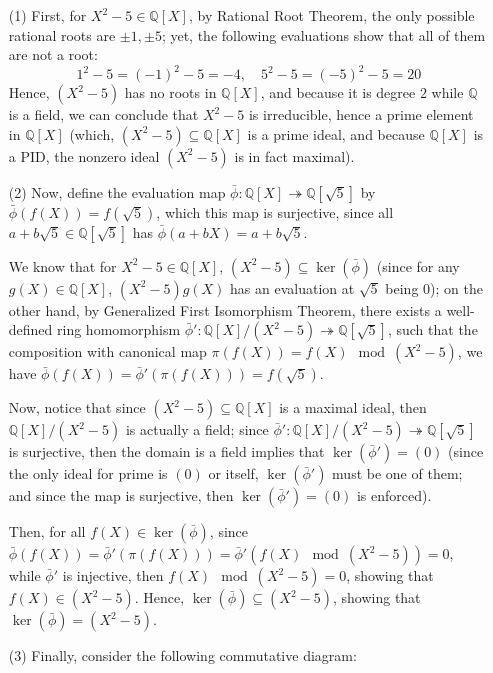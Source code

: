 \documentclass{article}
\begin{document}
\begin{itemize}
    \item[(1)] First, for $X^2-5\in \mathbb{Q}[X]$, by Rational Root Theorem, the only possible rational roots are $\pm 1,\pm 5$; yet, the following evaluations show that all of them are not a root:
    $$1^2-5 = (-1)^2-5 = -4,\quad 5^2-5 = (-5)^2-5 = 20$$
    Hence, $(X^2-5)$ has no roots in $\mathbb{Q}[X]$, and because it is degree $2$ while $\mathbb{Q}$ is a field, we can conclude that $X^2-5$ is irreducible, hence a prime element in $\mathbb{Q}[X]$ (which, $(X^2-5)\subseteq \mathbb{Q}[X]$ is a prime ideal, 
    and because $\mathbb{Q}[X]$ is a PID, the nonzero ideal $(X^2-5)$ is in fact maximal).

    \hfil

    \item[(2)] Now, define the evaluation map $\bar{\phi}:\mathbb{Q}[X]\twoheadrightarrow \mathbb{Q}[\sqrt{5}]$ by 
    $\bar{\phi}(f(X))=f(\sqrt{5})$, which this map is surjective, since all $a+b\sqrt{5}\in\mathbb{Q}[\sqrt{5}]$ has $\bar{\phi}(a+bX)=a+b\sqrt{5}$.
    
    We know that for $X^2-5\in \mathbb{Q}[X]$, $(X^2-5)\subseteq \ker(\bar{\phi})$ (since for any $g(X)\in\mathbb{Q}[X]$, $(X^2-5)g(X)$ has an evaluation at $\sqrt{5}$ being $0$); on the other hand, by Generalized First Isomorphism Theorem, 
    there exists a well-defined ring homomorphism $\bar{\phi}':\mathbb{Q}[X]/(X^2-5)\twoheadrightarrow \mathbb{Q}[\sqrt{5}]$, such that the composition with canonical map $\pi(f(X))=f(X)\mod (X^2-5)$, we have $\bar{\phi}(f(X))=\bar{\phi}'(\pi(f(X)))=f(\sqrt{5})$.

    Now, notice that since $(X^2-5)\subseteq \mathbb{Q}[X]$ is a maximal ideal, then $\mathbb{Q}[X]/(X^2-5)$ is actually a field;
    since $\bar{\phi}':\mathbb{Q}[X]/(X^2-5)\twoheadrightarrow \mathbb{Q}[\sqrt{5}]$ is surjective, then the domain is a field implies that $\ker(\bar{\phi}') = (0)$ (since the only ideal for prime is $(0)$ or itself, $\ker(\bar{\phi}')$ must be one of them; and since the map is surjective,
    then $\ker(\bar{\phi}')=(0)$ is enforced). 

    Then, for all $f(X)\in \ker(\bar{\phi})$, since $\bar{\phi}(f(X))=\bar{\phi}'(\pi(f(X))) = \bar{\phi}'(f(X)\mod (X^2-5)) = 0$, while $\bar{\phi}'$ is injective,
    then $f(X)\mod (X^2-5) = 0$, showing that $f(X)\in (X^2-5)$. Hence, $\ker(\bar{\phi})\subseteq (X^2-5)$, showing that $\ker(\bar{\phi})=(X^2-5)$.

    \hfil

    \item[(3)] Finally, consider the following commutative diagram:
    

\end{itemize}
\end{document}
